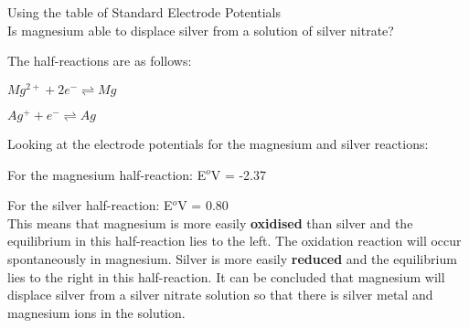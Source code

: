 \begin{wex}{Using the table of Standard Electrode Potentials\\}{
Is magnesium able to displace silver from a solution of silver nitrate?}
{ %


The half-reactions are as follows:

\rm${Mg^{2+} + 2e^{-} \rightleftharpoons Mg}$

\rm${Ag^{+} + e^{-} \rightleftharpoons Ag}$\\


Looking at the electrode potentials for the magnesium and silver reactions: 

For the magnesium half-reaction: E$^{o}$V = -2.37

For the silver half-reaction: E$^{o}$V = 0.80\\

This means that magnesium is more easily \textbf{oxidised} than silver and the equilibrium in this half-reaction lies to the left. The oxidation reaction will occur spontaneously in magnesium. Silver is more easily \textbf{reduced} and the equilibrium lies to the right in this half-reaction. It can be concluded that magnesium will displace silver from a silver nitrate solution so that there is silver metal and magnesium ions in the solution.
}
\end{wex}

